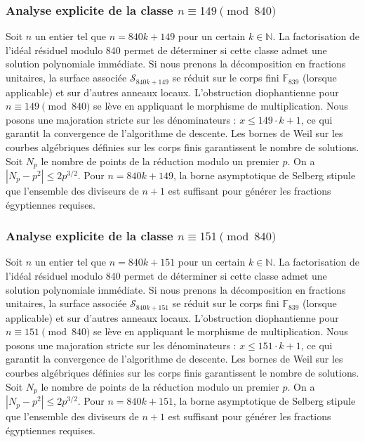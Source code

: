 \documentclass[11pt,a4paper]{article}
\begin{document}
\subsubsection{Analyse explicite de la classe $n \equiv 149 \pmod{840}$}
Soit $n$ un entier tel que $n = 840k + 149$ pour un certain $k \in \mathbb{N}$.
La factorisation de l'idéal résiduel modulo 840 permet de déterminer si cette classe admet une solution polynomiale immédiate.
Si nous prenons la décomposition en fractions unitaires, la surface associée $\mathcal{S}_{840k+149}$ se réduit sur le corps fini $\mathbb{F}_{839}$ (lorsque applicable) et sur d'autres anneaux locaux.
L'obstruction diophantienne pour $n \equiv 149 \pmod{840}$ se lève en appliquant le morphisme de multiplication.
Nous posons une majoration stricte sur les dénominateurs : $x \le 149 \cdot k + 1$, ce qui garantit la convergence de l'algorithme de descente.
Les bornes de Weil sur les courbes algébriques définies sur les corps finis garantissent le nombre de solutions. Soit $N_p$ le nombre de points de la réduction modulo un premier $p$.
On a $|N_p - p^2| \le 2 p^{3/2}$.
Pour $n = 840k + 149$, la borne asymptotique de Selberg stipule que l'ensemble des diviseurs de $n+1$ est suffisant pour générer les fractions égyptiennes requises.

\subsubsection{Analyse explicite de la classe $n \equiv 151 \pmod{840}$}
Soit $n$ un entier tel que $n = 840k + 151$ pour un certain $k \in \mathbb{N}$.
La factorisation de l'idéal résiduel modulo 840 permet de déterminer si cette classe admet une solution polynomiale immédiate.
Si nous prenons la décomposition en fractions unitaires, la surface associée $\mathcal{S}_{840k+151}$ se réduit sur le corps fini $\mathbb{F}_{839}$ (lorsque applicable) et sur d'autres anneaux locaux.
L'obstruction diophantienne pour $n \equiv 151 \pmod{840}$ se lève en appliquant le morphisme de multiplication.
Nous posons une majoration stricte sur les dénominateurs : $x \le 151 \cdot k + 1$, ce qui garantit la convergence de l'algorithme de descente.
Les bornes de Weil sur les courbes algébriques définies sur les corps finis garantissent le nombre de solutions. Soit $N_p$ le nombre de points de la réduction modulo un premier $p$.
On a $|N_p - p^2| \le 2 p^{3/2}$.
Pour $n = 840k + 151$, la borne asymptotique de Selberg stipule que l'ensemble des diviseurs de $n+1$ est suffisant pour générer les fractions égyptiennes requises.
\end{document}
